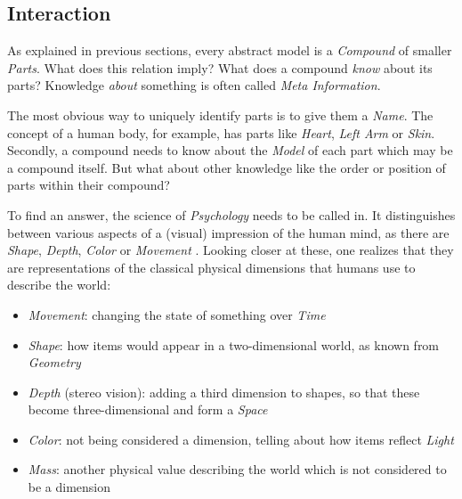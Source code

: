 %
%
%
%
%
%
%

\subsection{Interaction}
\label{interaction_heading}

As explained in previous sections, every abstract model is a \emph{Compound} of
smaller \emph{Parts}. What does this relation imply? What does a compound
\emph{know} about its parts? Knowledge \emph{about} something is often called
\emph{Meta Information}.

The most obvious way to uniquely identify parts is to give them a \emph{Name}. The
concept of a human body, for example, has parts like \emph{Heart}, \emph{Left Arm}
or \emph{Skin}. Secondly, a compound needs to know about the \emph{Model} of each
part which may be a compound itself. But what about other knowledge like
the order or position of parts within their compound?

To find an answer, the science of \emph{Psychology} needs to be called in. It
distinguishes between various aspects of a (visual) impression of the human mind,
as there are \emph{Shape}, \emph{Depth}, \emph{Color} or \emph{Movement}
\cite{stoerig}. Looking closer at these, one realizes that they are representations
of the classical physical dimensions that humans use to describe the world:

\begin{itemize}
    \item{\emph{Movement}: changing the state of something over \emph{Time}}
    \item{\emph{Shape}: how items would appear in a two-dimensional world, as
        known from \emph{Geometry}}
    \item{\emph{Depth} (stereo vision): adding a third dimension to shapes, so
        that these become three-dimensional and form a \emph{Space}}
    \item{\emph{Color}: not being considered a dimension, telling about how items
        reflect \emph{Light}}
    \item{\emph{Mass}: another physical value describing the world which is not
        considered to be a dimension}
\end{itemize}

